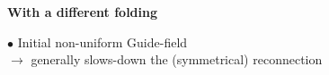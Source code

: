 \documentclass[landscape]{slides}
\begin{document}


\begin{slide}
\large{\textbf{With a different folding}}



$\bullet$ Initial non-uniform Guide-field\\
$\rightarrow$ generally slows-down the (symmetrical) reconnection

\end{slide}

\end{document}
